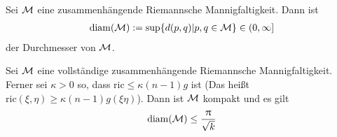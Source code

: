 \begin{defs}[Durchmesser]
Sei $\mathcal{M}$ eine zusammenhängende Riemannsche Mannigfaltigkeit.
Dann ist
\begin{align}
    \operatorname{diam} (\mathcal{M}):= \sup \{ d(p, q) \vert p, q \in \mathcal{M} \} \in (0, \infty]
\end{align}
der Durchmesser von $\mathcal{M}$.
\end{defs}

\begin{satz}
\label{satz:bonnetmyers}
Sei $\mathcal{M}$ eine vollständige zusammenhängende Riemannsche Mannigfaltigkeit.
Ferner sei $\kappa > 0$ so, dass $\text{ric} \leq \kappa (n - 1) g$ ist 
(Das heißt $\text{ric} (\xi , \eta) \geq \kappa (n - 1) g( \xi \eta)$).
Dann ist $\mathcal{M}$ kompakt und es gilt
\begin{align}
    \operatorname{diam} (\mathcal{M}) \leq \frac{\uppi}{\sqrt{k}}
\end{align}
\end{satz}

